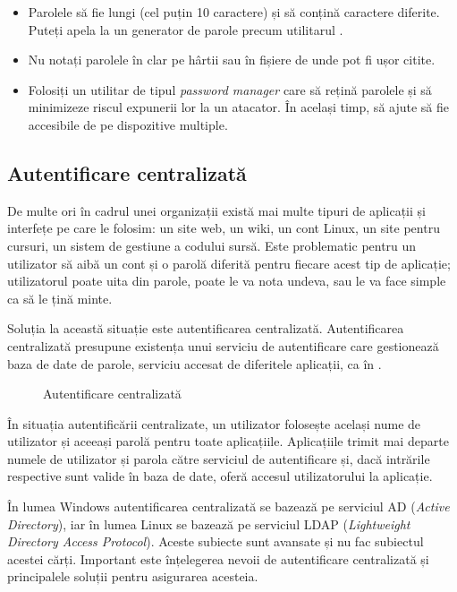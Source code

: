 \begin{itemize}
  \item Parolele să fie lungi (cel puțin 10 caractere) și să conțină
          caractere diferite. Puteți apela la un generator de parole
          precum utilitarul .
  \item Nu notați parolele în clar pe hârtii sau în fișiere de unde pot fi
          ușor citite.
  \item Folosiți un utilitar de tipul \textit{password manager} care să rețină
          parolele și să minimizeze riscul expunerii lor la un atacator.
          În același timp, să ajute să fie accesibile de pe dispozitive
          multiple.
\end{itemize}

\subsection{Autentificare centralizată}
\label{sec:user:centralized-auth}

De multe ori în cadrul unei organizații există mai multe tipuri de aplicații și
interfețe pe care le folosim: un site web, un wiki, un cont Linux, un site
pentru cursuri, un sistem de gestiune a codului sursă. Este problematic pentru
un utilizator să aibă un cont și o parolă diferită pentru fiecare acest tip de
aplicație; utilizatorul poate uita din parole, poate le va nota undeva, sau le
va face simple ca să le țină minte.

Soluția la această situație este autentificarea centralizată. Autentificarea
centralizată presupune existența unui serviciu de autentificare care gestionează
baza de date de parole, serviciu accesat de diferitele aplicații, ca în .

\begin{figure}[htbp]
  \centering
  \def\svgwidth{0.7\columnwidth}
  
  \caption{Autentificare centralizată}
  \label{fig:user:centralized-auth}
\end{figure}

În situația autentificării centralizate, un utilizator folosește același nume de
utilizator și aceeași parolă pentru toate aplicațiile. Aplicațiile trimit mai
departe numele de utilizator și parola către serviciul de autentificare și, dacă
intrările respective sunt valide în baza de date, oferă accesul utilizatorului
la aplicație.

În lumea Windows autentificarea centralizată se bazează pe serviciul AD
 (\textit{Active Directory}), iar în lumea Linux se bazează
pe serviciul LDAP 
(\textit{Lightweight Directory Access Protocol}). Aceste subiecte sunt avansate și nu fac
subiectul acestei cărți. Important este înțelegerea nevoii de autentificare
centralizată și principalele soluții pentru asigurarea acesteia.

